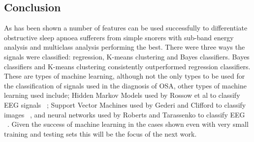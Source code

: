 \subsection{Conclusion}
As has been shown a number of features can be used successfully to differentiate obstructive sleep apnoea sufferers from simple snorers with sub-band energy analysis and multiclass analysis performing the best. There were three ways the signals were classified: regression, K-means clustering and Bayes classifiers. Bayes classifiers and K-means clustering consistently outperformed regression classifiers. These are types of machine learning, although not the only types to be used for the classification of signals used in the diagnosis of OSA, other types of machine learning used include; Hidden Markov Models used by Rossow et al to classify EEG signals ~\cite{rossow2011automatic}; Support Vector Machines used by Gederi and Clifford to classify images ~\cite{gederi2012fusion}, and neural networks used by Roberts and Tarassenko to classify EEG ~\cite{roberts1992new}. Given the success of machine learning in the cases shown even with very small training and testing sets this will be the focus of the next work. 
